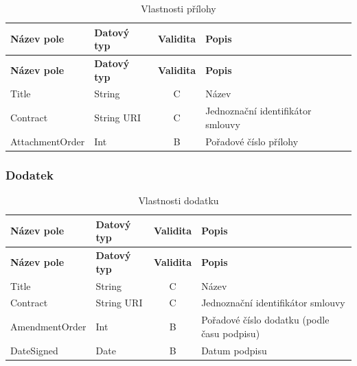 \begin{center}
\begin{longtable}{lp{20mm}cp{65mm}}
\label{grid_mlmmh} \\
\multicolumn{1}{l}{\textbf{Název pole}} & 
\multicolumn{1}{l}{\textbf{Datový typ}} & 
\multicolumn{1}{l}{\textbf{Validita}} & 
\multicolumn{1}{l}{\textbf{Popis}} \\ \hline 
\endfirsthead
\multicolumn{1}{l}{\textbf{Název pole}} & 
\multicolumn{1}{l}{\textbf{Datový typ}} & 
\multicolumn{1}{l}{\textbf{Validita}} & 
\multicolumn{1}{l}{\textbf{Popis}} \\ \hline 
\hline
\endhead
\endfoot
\caption{Vlastnosti přílohy}
\endlastfoot
\rowcolor{validateC}Title & String & C & Název \\
\rowcolor{validateC}Contract & String URI & C & Jednoznační identifikátor smlouvy \\
\rowcolor{validateB}AttachmentOrder & Int & B & Pořadové číslo přílohy \\
\end{longtable}
\end{center}

\subsubsection*{Dodatek}

\begin{center}
\begin{longtable}{lp{20mm}cp{65mm}}
\label{grid_mlmmh} \\
\multicolumn{1}{l}{\textbf{Název pole}} & 
\multicolumn{1}{l}{\textbf{Datový typ}} & 
\multicolumn{1}{l}{\textbf{Validita}} & 
\multicolumn{1}{l}{\textbf{Popis}} \\ \hline 
\endfirsthead
\multicolumn{1}{l}{\textbf{Název pole}} & 
\multicolumn{1}{l}{\textbf{Datový typ}} & 
\multicolumn{1}{l}{\textbf{Validita}} & 
\multicolumn{1}{l}{\textbf{Popis}} \\ \hline 
\hline
\endhead
\endfoot
\caption{Vlastnosti dodatku}
\endlastfoot
\rowcolor{validateC}Title & String & C & Název \\
\rowcolor{validateC}Contract & String URI & C & Jednoznační identifikátor smlouvy \\
\rowcolor{validateB}AmendmentOrder & Int & B & Pořadové číslo dodatku (podle času podpisu) \\
\rowcolor{validateB}DateSigned & Date & B & Datum podpisu \\
\end{longtable}
\end{center}

